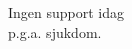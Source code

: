 \documentclass[a4paper,12pt]{article}
\begin{document}
\linespread{2}
\centering

\mbox{}
\vspace{2.5cm}

\fontsize{40}{40}\selectfont
\normalfont
Ingen support idag\\
p.g.a. sjukdom.
\end{document}
